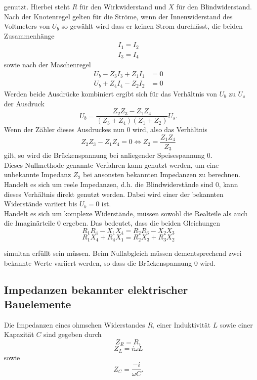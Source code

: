 genutzt.
Hierbei steht $R$ für den Wirkwiderstand und $X$ für den Blindwiderstand. \\
Nach der Knotenregel gelten für die Ströme, wenn der Innenwiderstand des Voltmeters von $U_b$ so gewählt wird dass er keinen Strom durchlässt, die beiden Zusammenhänge
\begin{gather}
  I_1 = I_2 \\
  I_3 = I_4
\end{gather}
sowie nach der Maschenregel
\begin{align}
  U_b - Z_3 I_3 + Z_1 I_1 &= 0 \\
  U_b + Z_4 I_4 - Z_2 I_2 &= 0
\end{align}
Werden beide Ausdrücke kombiniert ergibt sich für das Verhältnis von $U_b$ zu $U_s$ der Ausdruck
\begin{equation}
  U_b = \frac{Z_2 Z_3 - Z_1 Z_4}{(Z_3 + Z_4)(Z_1 + Z_2)}U_s.
\end{equation}
Wenn der Zähler dieses Ausdruckes nun 0 wird, also das Verhältnis
\begin{equation}
Z_2 Z_3 - Z_1 Z_4 = 0 \iff Z_2 = \frac{Z_1 Z_4}{Z_3} \label{eqn:1}
\end{equation}
gilt, so wird die Brückenspannung bei anliegender Speisespannung 0.\\
Dieses Nullmethode genannte Verfahren kann genutzt werden, um eine unbekannte Impedanz $Z_2$ bei ansonsten bekannten Impedanzen zu berechnen.
Handelt es sich um reele Impedanzen, d.h. die Blindwiderstände sind 0, kann dieses Verhältnis direkt genutzt werden.
Dabei wird einer der bekannten Widerstände variiert bis $U_b=0$ ist.\\
Handelt es sich um komplexe Widerstände, müssen sowohl die Realteile als auch die Imaginärteile 0 ergeben.
Das bedeutet, dass die beiden Gleichungen
\begin{equation}
  R_1 R_4 - X_1 X_4 = R_2 R_3 - X_2 X_3
  \label{eqn:bed1}
\end{equation}
\begin{equation}
  R_1 X_4 + R_4 X_1 = R_2 X_3 + R_3 X_2
  \label{eqn:bed2}
\end{equation}

simultan erfüllt sein müssen.
Beim Nullabgleich müssen dementsprechend zwei bekannte Werte variiert werden, so dass die Brückenspannung 0 wird.
\subsection{Impedanzen bekannter elektrischer Bauelemente}
Die Impedanzen eines ohmschen Widerstandes $R$, einer Induktivität $L$ sowie einer Kapazität $C$ sind gegeben durch
\begin{equation}
  Z_R = R,
\end{equation}
\begin{equation}
  Z_L = i \omega L
\end{equation}
sowie
\begin{equation}
  Z_C = \frac{-i}{\omega C}.
\end{equation}\cite{sample}
\newpage
